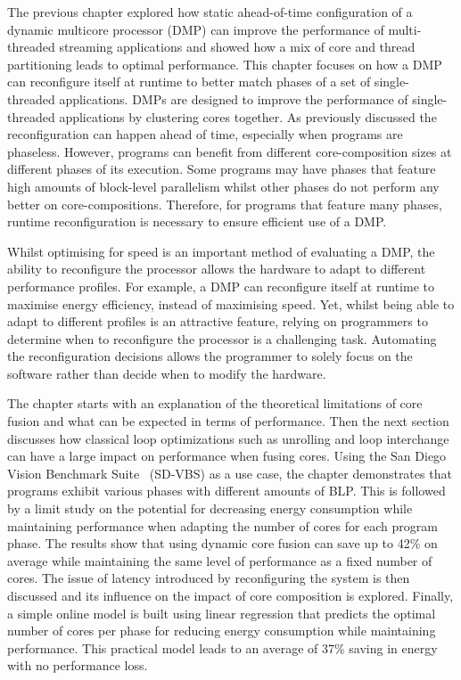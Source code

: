 The previous chapter explored how static ahead-of-time configuration of a dynamic multicore processor (DMP) can improve the performance of multi-threaded streaming applications and showed how a mix of core and thread partitioning leads to optimal performance.
This chapter focuses on how a DMP can reconfigure itself at runtime to better match phases of a set of single-threaded applications.
DMPs are designed to improve the performance of single-threaded applications by clustering cores together.
As previously discussed the reconfiguration can happen ahead of time, especially when programs are phaseless.
However, programs can benefit from different core-composition sizes at different phases of its execution.
Some programs may have phases that feature high amounts of block-level parallelism whilst other phases do not perform any better on core-compositions.
Therefore, for programs that feature many phases, runtime reconfiguration is necessary to ensure efficient use of a DMP.

Whilst optimising for speed is an important method of evaluating a DMP, the ability to reconfigure the processor allows the hardware to adapt to different performance profiles.
For example, a DMP can reconfigure itself at runtime to maximise energy efficiency, instead of maximising speed.
Yet, whilst being able to adapt to different profiles is an attractive feature, relying on programmers to determine when to reconfigure the processor is a challenging task.
Automating the reconfiguration decisions allows the programmer to solely focus on the software rather than decide when to modify the hardware.

The chapter starts with an explanation of the theoretical limitations of core fusion and what can be expected in terms of performance.
Then the next section discusses how classical loop optimizations such as unrolling and loop interchange can have a large impact on performance when fusing cores.
Using the San Diego Vision Benchmark Suite~\cite{sdvbs} (SD-VBS) as a use case, the chapter demonstrates that programs exhibit various phases with different amounts of BLP.
This is followed by a limit study on the potential for decreasing energy consumption while maintaining performance when adapting the number of cores for each program phase.
The results show that using dynamic core fusion can save up to 42\% on average while maintaining the same level of performance as a fixed number of cores.
The issue of latency introduced by reconfiguring the system is then discussed and its influence on the impact of core composition is explored.
Finally, a simple online model is built using linear regression that predicts the optimal number of cores per phase for reducing energy consumption while maintaining performance.
This practical model leads to an average of 37\% saving in energy with no performance loss.

